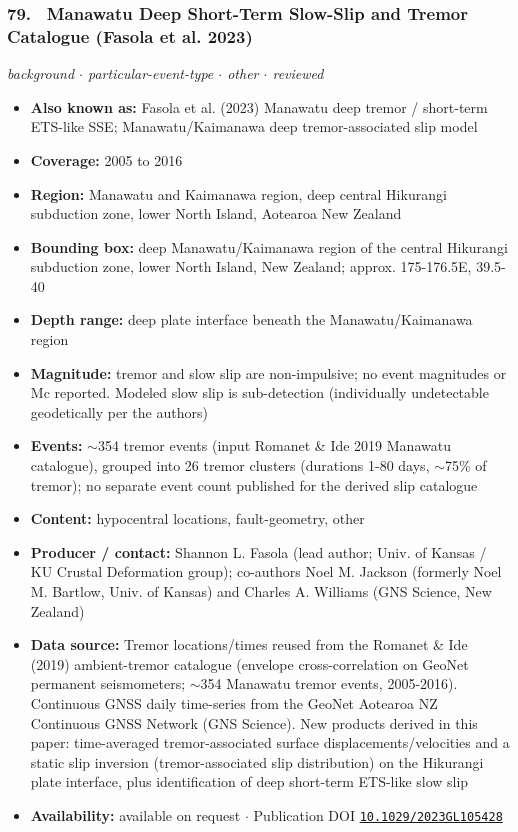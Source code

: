 \documentclass[10pt,a4paper]{article}
\newcommand{\kv}[2]{\item \textbf{#1:} #2}
\begin{document}
\subsubsection*{\hypertarget{c:79}{79.}~ Manawatu Deep Short-Term Slow-Slip and Tremor Catalogue (Fasola et al. 2023)}
{\small\itshape background $\cdot$ particular-event-type $\cdot$ other $\cdot$ reviewed}\par\vspace{2pt}
\begin{itemize}[leftmargin=1.3em,itemsep=0.6pt,topsep=1pt,parsep=0pt]
\kv{Also known as}{Fasola et al. (2023) Manawatu deep tremor / short-term ETS-like SSE; Manawatu/Kaimanawa deep tremor-associated slip model}
\kv{Coverage}{2005 to 2016}
\kv{Region}{Manawatu and Kaimanawa region, deep central Hikurangi subduction zone, lower North Island, Aotearoa New Zealand}
\kv{Bounding box}{deep Manawatu/Kaimanawa region of the central Hikurangi subduction zone, lower North Island, New Zealand; approx. 175-176.5E, 39.5-40}
\kv{Depth range}{deep plate interface beneath the Manawatu/Kaimanawa region}
\kv{Magnitude}{tremor and slow slip are non-impulsive; no event magnitudes or Mc reported. Modeled slow slip is sub-detection (individually undetectable geodetically per the authors)}
\kv{Events}{$\sim$354 tremor events (input Romanet \& Ide 2019 Manawatu catalogue), grouped into 26 tremor clusters (durations 1-80 days, $\sim$75\% of tremor); no separate event count published for the derived slip catalogue}
\kv{Content}{hypocentral locations, fault-geometry, other}
\kv{Producer / contact}{Shannon L. Fasola (lead author; Univ. of Kansas / KU Crustal Deformation group); co-authors Noel M. Jackson (formerly Noel M. Bartlow, Univ. of Kansas) and Charles A. Williams (GNS Science, New Zealand)}
\kv{Data source}{Tremor locations/times reused from the Romanet \& Ide (2019) ambient-tremor catalogue (envelope cross-correlation on GeoNet permanent seismometers; $\sim$354 Manawatu tremor events, 2005-2016). Continuous GNSS daily time-series from the GeoNet Aotearoa NZ Continuous GNSS Network (GNS Science). New products derived in this paper: time-averaged tremor-associated surface displacements/velocities and a static slip inversion (tremor-associated slip distribution) on the Hikurangi plate interface, plus identification of deep short-term ETS-like slow slip}
\kv{Availability}{available on request $\cdot$ Publication DOI \href{https://doi.org/10.1029/2023GL105428}{\nolinkurl{10.1029/2023GL105428}}}
\end{itemize}
\end{document}
